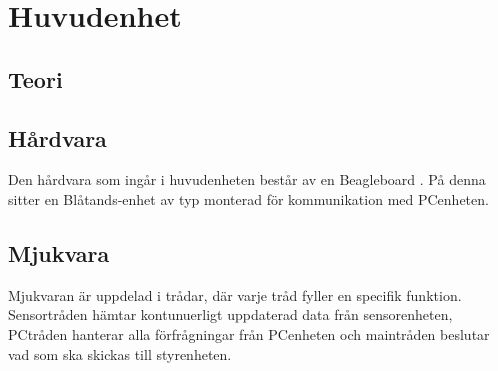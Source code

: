 
\section{Huvudenhet}

\subsection{Teori}

\subsection{Hårdvara}
Den hårdvara som ingår i huvudenheten består av en Beagleboard . På denna sitter en Blåtands-enhet av typ  monterad för kommunikation med PCenheten. 

\subsection{Mjukvara}

Mjukvaran är uppdelad i  trådar, där varje tråd fyller en specifik funktion. Sensortråden hämtar kontunuerligt uppdaterad data från sensorenheten, PCtråden hanterar alla förfrågningar från PCenheten och maintråden beslutar vad som ska skickas till styrenheten.

